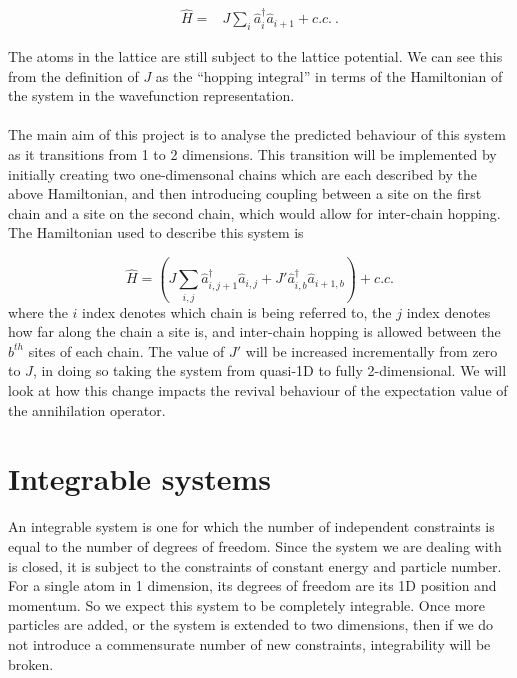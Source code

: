 \documentclass[a4paper,10pt]{article}
\begin{document}
\begin{equation}
\begin{align*}
\hat{H}=&J\sum_{i}\hat{a}^\dagger_{i}\hat{a}_{i+1}+c.c.\ .
\end{align*}
\end{equation}

The atoms in the lattice are still subject to the lattice potential. We can see this from the definition of $J$ as the ``hopping integral'' in terms of the Hamiltonian of
the system in the wavefunction representation.
\\\\
 The main aim of this project is to analyse the predicted behaviour of this system as it transitions from 1 to 2 dimensions. This transition will be implemented by initially 
 creating two one-dimensonal chains which are each described by the above Hamiltonian, and then introducing coupling between a site on the first chain and a site on the second
 chain, which would allow for inter-chain hopping. The Hamiltonian used to describe this system is
 
\begin{equation}
\hat{H}=(J\sum_{i,j}\hat{a}^\dagger_{i,j+1}\hat{a}_{i,j} + J'\hat{a}^\dagger_{i,b}\hat{a}_{i+1,b})+c.c.
\end{equation}
where the $i$ index denotes which chain is being referred to, the $j$ index denotes how far along the chain a site is, and inter-chain hopping is allowed between the $b^{th}$ 
sites of each chain. The value of $J'$ will be increased incrementally from zero to $J$, in doing so taking the system from quasi-1D to fully 2-dimensional. We will look at how
this change impacts the revival behaviour of the expectation value of the annihilation operator.


\section{Integrable systems}
An integrable system is one for which the number of independent constraints is equal to the number of degrees of freedom. Since the system we are dealing with
is closed, it is subject to the constraints of constant energy and particle number. For a single atom in 1 dimension, its degrees of freedom are its 1D position and momentum.
So we expect this system to be completely integrable. Once more particles are added, or the system is extended to two dimensions, then if we do not introduce a commensurate number
of new constraints, integrability will be broken.
\end{document}
